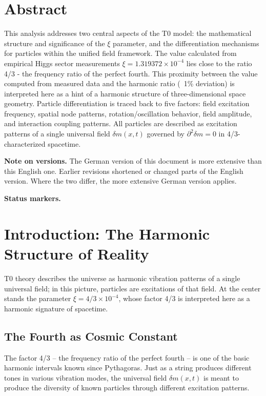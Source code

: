 \section*{Abstract}
		This analysis addresses two central aspects of the T0 model: the mathematical structure and significance of the $\xi$ parameter, and the differentiation mechanisms for particles within the unified field framework. The value calculated from empirical Higgs sector measurements $\xi = 1.319372 \times 10^{-4}$ lies close to the ratio 4/3 - the frequency ratio of the perfect fourth. This proximity between the value computed from measured data and the harmonic ratio (~1\% deviation) is interpreted here as a hint of a harmonic structure of three-dimensional space geometry. Particle differentiation is traced back to five factors: field excitation frequency, spatial node patterns, rotation/oscillation behavior, field amplitude, and interaction coupling patterns. All particles are described as excitation patterns of a single universal field $\delta m(x,t)$ governed by $\partial^2\delta m = 0$ in 4/3-characterized spacetime.

	\medskip\noindent\textbf{Note on versions.} The German version of this document is more extensive than this English one. Earlier revisions shortened or changed parts of the English version. Where the two differ, the more extensive German version applies.


	\medskip\noindent\textbf{Status markers.}
	

	
	
	\section{Introduction: The Harmonic Structure of Reality}
	\label{sec:introduction}
	
	T0 theory describes the universe as harmonic vibration patterns of a single universal field; in this picture, particles are excitations of that field. At the center stands the parameter $\xi = 4/3 \times 10^{-4}$, whose factor 4/3 is interpreted here as a harmonic signature of spacetime.
	
	\subsection{The Fourth as Cosmic Constant}
	\label{subsec:fourth-constant}
	
	The factor 4/3 -- the frequency ratio of the perfect fourth -- is one of the basic harmonic intervals known since Pythagoras. Just as a string produces different tones in various vibration modes, the universal field $\delta m(x,t)$ is meant to produce the diversity of known particles through different excitation patterns.
	
